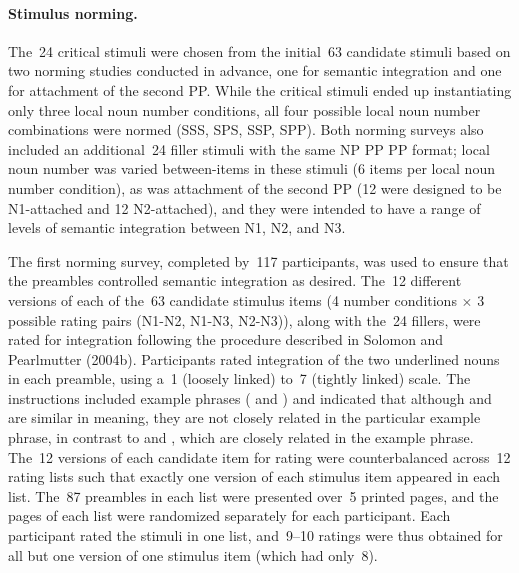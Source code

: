 \documentclass[12pt,titlepage]{article}
\begin{document}
\paragraph{Stimulus norming.} The~24 critical stimuli were chosen from
the initial~63 candidate stimuli based on two norming studies
conducted in advance, one for semantic integration and one for
attachment of the second PP\@.  While the critical stimuli ended up
instantiating only three local noun number conditions, all four
possible local noun number combinations were normed (SSS, SPS, SSP,
SPP)\@.  Both norming surveys also included an additional~24 filler
stimuli with the same NP PP PP format; local noun number was varied
between-items in these stimuli (6 items per local noun number
condition), as was attachment of the second PP (12 were designed to be
N1-attached and 12 N2-attached), and they were intended to have a
range of levels of semantic integration between N1, N2, and N3.  

The first norming survey, completed by~117 participants, was used to
ensure that the preambles controlled semantic integration as desired.
The~12 different versions of each of the~63 candidate stimulus items
(4 number conditions $\times$ 3 possible rating pairs (N1-N2, N1-N3,
N2-N3)), along with the~24 fillers, were rated for integration
following the procedure described in Solomon and Pearlmutter (2004b).
Participants rated integration of the two underlined nouns in each
preamble, using a~1 (loosely linked) to~7 (tightly linked) scale.  The
instructions included example phrases ( and ) and indicated that
although  and  are similar in meaning, they
are not closely related in the particular example phrase, in contrast
to  and , which are closely related in the
example phrase.  The~12 versions of each candidate item for rating
were counterbalanced across~12 rating lists such that exactly one
version of each stimulus item appeared in each list.  The~87 preambles
in each list were presented over~5 printed pages, and the pages of
each list were randomized separately for each participant.  Each
participant rated the stimuli in one list, and~9--10 ratings were thus
obtained for all but one version of one stimulus item (which had 
only~8).
\end{document}
